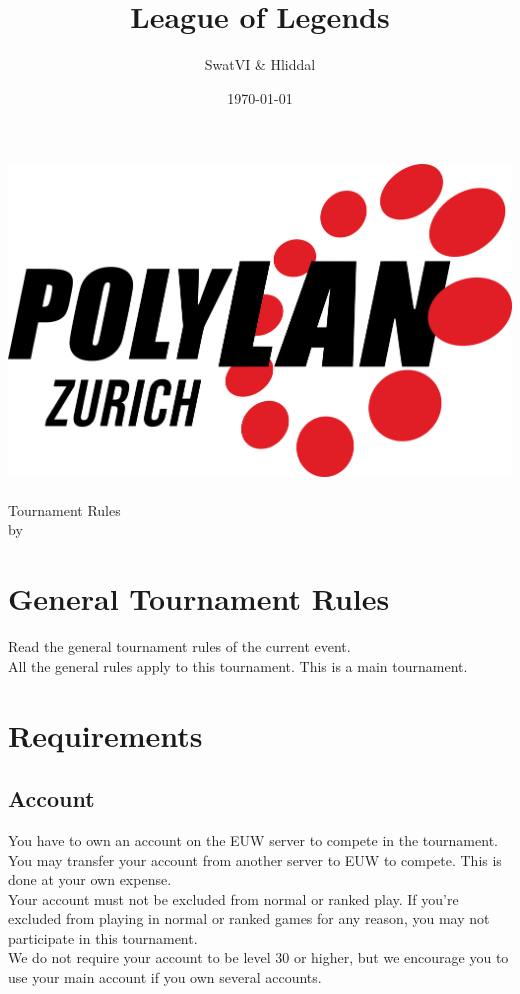 \documentclass{article}
\title{League of Legends}
\author{SwatVI \& Hliddal}
\date{\today}
\begin{document}
\makeatletter
\begin{titlepage}
\centering
\includegraphics[scale=0.1]{../img/PolyLAN_Zurich_black.png}\\
\LARGE \@title\\ Tournament Rules\\ \normalsize by \@author\\ \@date
\end{titlepage}
\makeatother


\clearpage

\tableofcontents
\clearpage

\section{General Tournament Rules}
Read the general tournament rules of the current event.\\
All the general rules apply to this tournament. This is a main tournament.

\section{Requirements}
\subsection{Account}
You have to own an account on the EUW server to compete in the tournament. You may transfer your account from another server to EUW to compete. This is done at your own expense.
\\
Your account must not be excluded from normal or ranked play. If you're excluded from playing in normal or ranked games for any reason, you may not participate in this tournament.
\\
We do not require your account to be level 30 or higher, but we encourage you to use your main account if you own several accounts.
\end{document}
